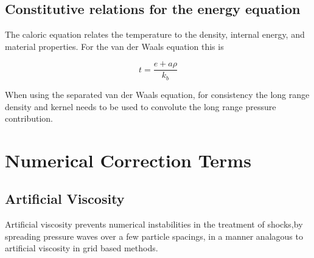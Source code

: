 

\subsection{Constitutive relations for the energy equation}

The caloric equation relates the temperature to the density, internal energy,
and material properties.  For the van der Waals equation this is

\begin{equation}
t = \frac{e + a \rho}{k_b}
\end{equation}

When using the separated van der Waals equation, for consistency the long range
density and kernel needs to be used to convolute the long range pressure
contribution.


%
%

\section{Numerical Correction Terms}

%
%

\subsection{Artificial Viscosity}
Artificial viscosity prevents numerical instabilities in the treatment of
shocks,by spreading pressure waves over a few particle spacings, in a manner
analagous to artificial viscosity in grid based methods. \cite[Hoover 2005
p46,90]{hoover_smooth_2006} \cite[Liu 2003 p125]{liu_smoothed_2003} 

